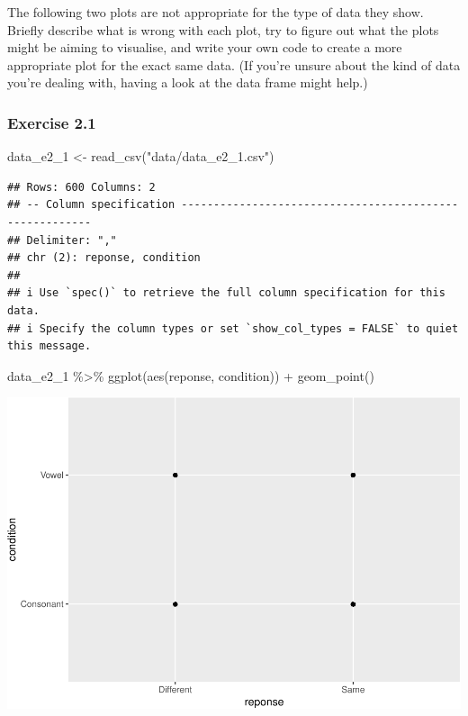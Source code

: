 \documentclass[
]{article}
\newenvironment{Shaded}{\begin{snugshade}}{\end{snugshade}}
\newcommand{\FunctionTok}[1]{\textcolor[rgb]{0.00,0.00,0.00}{#1}}
\newcommand{\NormalTok}[1]{#1}
\newcommand{\OtherTok}[1]{\textcolor[rgb]{0.56,0.35,0.01}{#1}}
\newcommand{\SpecialCharTok}[1]{\textcolor[rgb]{0.00,0.00,0.00}{#1}}
\newcommand{\StringTok}[1]{\textcolor[rgb]{0.31,0.60,0.02}{#1}}
\begin{document}
The following two plots are not appropriate for the type of data they
show. Briefly describe what is wrong with each plot, try to figure out
what the plots might be aiming to visualise, and write your own code to
create a more appropriate plot for the exact same data. (If you're
unsure about the kind of data you're dealing with, having a look at the
data frame might help.)

\hypertarget{exercise-2.1}{%
\subsubsection{Exercise 2.1}\label{exercise-2.1}}

\begin{Shaded}
\begin{Highlighting}[]
\NormalTok{data\_e2\_1 }\OtherTok{\textless{}{-}} \FunctionTok{read\_csv}\NormalTok{(}\StringTok{"data/data\_e2\_1.csv"}\NormalTok{)}
\end{Highlighting}
\end{Shaded}

\begin{verbatim}
## Rows: 600 Columns: 2
## -- Column specification --------------------------------------------------------
## Delimiter: ","
## chr (2): reponse, condition
## 
## i Use `spec()` to retrieve the full column specification for this data.
## i Specify the column types or set `show_col_types = FALSE` to quiet this message.
\end{verbatim}

\begin{Shaded}
\begin{Highlighting}[]
\NormalTok{data\_e2\_1 }\SpecialCharTok{\%\textgreater{}\%}
  \FunctionTok{ggplot}\NormalTok{(}\FunctionTok{aes}\NormalTok{(reponse, condition)) }\SpecialCharTok{+}
  \FunctionTok{geom\_point}\NormalTok{()}
\end{Highlighting}
\end{Shaded}

\includegraphics{analysis_files/figure-latex/e2-1-1.pdf}
\end{document}
